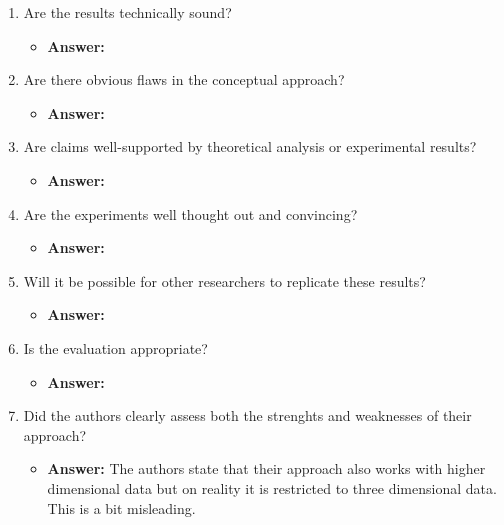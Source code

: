 \documentclass[a4paper]{article}
\begin{document}
\begin{enumerate}[label=(\alph*)]
	\item Are the results technically sound?
		\begin{itemize}
			\item \textbf{Answer:}	
		\end{itemize}			
	
	
	\item Are there obvious flaws in the conceptual approach?
		\begin{itemize}
			\item \textbf{Answer:}	
		\end{itemize}		
	
	
	\item Are claims well-supported by theoretical analysis or experimental results?
		\begin{itemize}
			\item \textbf{Answer:}	
		\end{itemize}		
	
	\item Are the experiments well thought out and convincing?
		\begin{itemize}
			\item \textbf{Answer:}	
		\end{itemize}		
	
	
	\item Will it be possible for other researchers to replicate these results?
		\begin{itemize}
			\item \textbf{Answer:}	
		\end{itemize}		
	
	
	\item Is the evaluation appropriate?
		\begin{itemize}
			\item \textbf{Answer:}	
		\end{itemize}		
	
	
	\item Did the authors clearly assess both the strenghts and weaknesses of their approach?
		\begin{itemize}
			\item \textbf{Answer:} The authors state that their approach also works with higher dimensional data but on reality it is restricted to three dimensional data. This is a bit misleading.
		\end{itemize}		
	
\end{enumerate}
\end{document}
